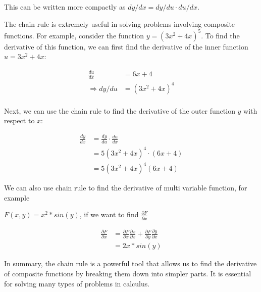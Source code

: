 This can be written more compactly as $dy/dx = dy/du \cdot du/dx$.

The chain rule is extremely useful in solving problems involving composite functions. For example, consider the function $y = (3x^2 + 4x)^5$. To find the derivative of this function, we can first find the derivative of the inner function $u = 3x^2 + 4x$:

\begin{align*}
\frac{du}{dx} &= 6x + 4 \\
\Rightarrow dy/du &= (3x^2 + 4x)^4 \\
\end{align*}

Next, we can use the chain rule to find the derivative of the outer function $y$ with respect to $x$:

\begin{align*}
  \frac{dy}{dx} &= \frac{dy}{du} \cdot \frac{du}{dx} \\
  &= 5(3x^2 + 4x)^4 \cdot (6x + 4) \\
  &= 5(3x^2 + 4x)^4(6x + 4)
  \end{align*}
  
  We can also use chain rule to find the derivative of multi variable function, for example 
  
  $F(x,y) = x^2*sin(y)$, if we want to find $\frac{\partial F}{\partial x}$
  
  \begin{align*}
  \frac{\partial F}{\partial x} &= \frac{\partial F}{\partial x}\frac{\partial x}{\partial x} + \frac{\partial F}{\partial y}\frac{\partial y}{\partial x}\\
  &= 2x*sin(y)
  \end{align*}
  
  In summary, the chain rule is a powerful tool that allows us to find the derivative of composite functions by breaking them down into simpler parts. It is essential for solving many types of problems in calculus.


